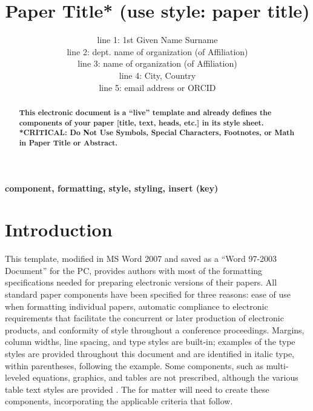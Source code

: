 \documentclass[journal,onecolumn]{IEEEtran}
\begin{document}
		
		\title{Paper Title* (use style: paper title)}
		
		\author{line 1: 1st Given Name Surname \\line 2: dept. name of organization 
			(of Affiliation)\\line 3: name of organization 
			(of Affiliation)\\line 4: City, Country\\line 5: email address or ORCID}

	\maketitle
	
\begin{abstract}
\textbf{This electronic document is a “live” template and already defines the components of your paper [title, text, heads, etc.] in its style sheet.  *CRITICAL:  Do Not Use Symbols, Special Characters, Footnotes, or Math in Paper Title or Abstract.} 
\end{abstract}
	

\begin{IEEEkeywords}
\textbf{component, formatting, style, styling, insert (key)}
\end{IEEEkeywords}
	
	\IEEEpeerreviewmaketitle
	
\section{Introduction}
This template, modified in MS Word 2007 and saved as a “Word 97-2003 Document” for the PC, provides authors with most of the formatting specifications needed for preparing electronic versions of their papers. All standard paper components have been specified for three reasons:  ease of use when formatting individual papers, automatic compliance to electronic requirements that facilitate the concurrent or later production of electronic products, and  conformity of style throughout a conference proceedings. Margins, column widths, line spacing, and type styles are built-in; examples of the type styles are provided throughout this document and are identified in italic type, within parentheses, following the example\cite{IEEEhowto:kopka}. Some components, such as multi-leveled equations, graphics, and tables are not prescribed, although the various table text styles are provided \cite{Simpson,I. S. Jacobs,Y. Yorozu} . The for matter will need to create these components, incorporating the applicable criteria that follow.
\end{document}
